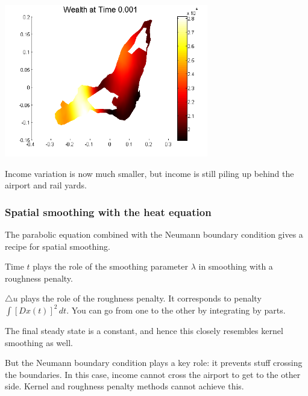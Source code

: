 \documentclass[11pt]{beamer}
\begin{document}

\begin{frame}


\includegraphics[width=3.5in]{figs/mtl_1e-3.png}

Income variation is now much smaller, but income is still piling
up behind the airport and rail yards.

\end{frame}


\begin{frame}

\frametitle{Spatial smoothing with the heat equation}

\bi
  \item The parabolic equation combined with the Neumann boundary
  condition gives a recipe for spatial smoothing.
  \item Time $t$ plays the role of the smoothing parameter
  $\lambda$ in smoothing with a roughness penalty.
  \item $\triangle u$ plays the role of the roughness penalty.
  It corresponds to penalty $\int [Dx(t)]^2 \, dt$.  You can
  go from one to the other by integrating by parts.
  \item The final steady state is a constant, and hence
  this closely resembles kernel smoothing as well.
  \item But the Neumann boundary condition plays a key role:
  it prevents stuff crossing the boundaries.  In this case,
  income cannot cross the airport to get to the other side.
  Kernel and roughness penalty methods cannot achieve this.
\ei

\end{frame}

\end{document}
